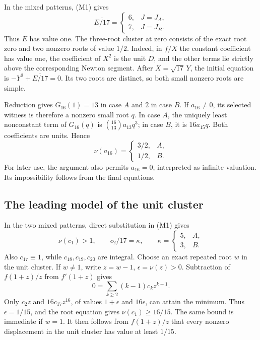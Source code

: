 \documentclass[
  british,
  10pt,
  a4paper,
]{article}
\begin{document}
In the mixed patterns, (M1) gives \[
\overline{E/17}=
\begin{cases}
6,&J=J_A,\\
7,&J=J_B.
\end{cases}                                                   \tag{M6}
\] Thus \(E\) has value one. The three-root cluster at zero consists of
the exact root zero and two nonzero roots of value \(1/2\). Indeed, in
\(f/X\) the constant coefficient has value one, the coefficient of
\(X^2\) is the unit \(D\), and the other terms lie strictly above the
corresponding Newton segment. After \(X=\sqrt{17}\,Y\), the initial
equation is \(-Y^2+\overline{E/17}=0\). Its two roots are distinct, so
both small nonzero roots are simple.

Reduction gives \(\bar G_{16}(1)=13\) in case \(A\) and \(2\) in case
\(B\). If \(a_{16}\neq0\), its selected witness is therefore a nonzero
small root \(q\). In case \(A\), the uniquely least nonconstant term of
\(G_{16}(q)\) is \(\binom{16}{13}a_{13}q^3\); in case \(B\), it is
\(16a_{15}q\). Both coefficients are units. Hence \[
\nu(a_{16})=
\begin{cases}
3/2,&A,\\
1/2,&B.
\end{cases}                                                   \tag{M7}
\] For later use, the argument also permits \(a_{16}=0\), interpreted as
infinite valuation. Its impossibility follows from the final equations.

\subsection{The leading model of the unit
cluster}\label{the-leading-model-of-the-unit-cluster}

In the two mixed patterns, direct substitution in (M1) gives \[
\nu(c_1)>1,\qquad
\overline{c_2/17}=\kappa,\qquad
\kappa=
\begin{cases}5,&A,\\3,&B.\end{cases}                            \tag{M8}
\] Also \(c_{17}\equiv1\), while \(c_{18},c_{19},c_{20}\) are integral.
Choose an exact repeated root \(w\) in the unit cluster. If \(w\neq1\),
write \(z=w-1\), \(\epsilon=\nu(z)>0\). Subtraction of \(f(1+z)/z\) from
\(f'(1+z)\) gives \[
0=\sum_{k\geq2}(k-1)c_kz^{k-1}.
\] Only \(c_2z\) and \(16c_{17}z^{16}\), of values \(1+\epsilon\) and
\(16\epsilon\), can attain the minimum. Thus \(\epsilon=1/15\), and the
root equation gives \(\nu(c_1)\geq16/15\). The same bound is immediate
if \(w=1\). It then follows from \(f(1+z)/z\) that every nonzero
displacement in the unit cluster has value at least \(1/15\).
\end{document}
